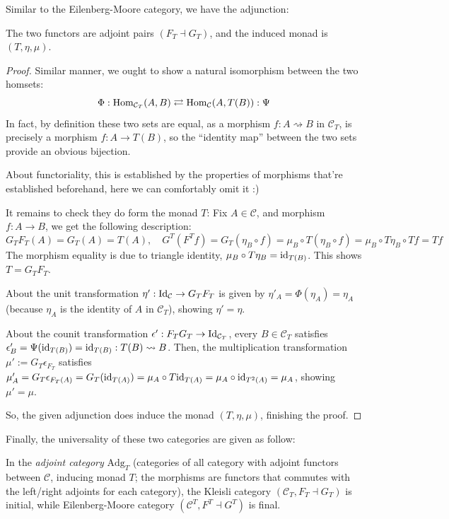 \documentclass{article}
\begin{document}
Similar to the Eilenberg-Moore category, we have the adjunction:
\begin{thm}
The two functors are adjoint pairs $(F_T\dashv G_T)$, and the induced monad is $(T,\eta,\mu)$.
\end{thm}
\begin{proof}
    Similar manner, we ought to show a natural isomorphism between the two homsets:
    \[\Phi:\mathrm{Hom}_{\mathcal{C}_T}(A,B)\rightleftarrows \mathrm{Hom}_\mathcal{C}(A,T(B)):\Psi\]
    In fact, by definition these two sets are equal, as a morphism $f:A\rightsquigarrow B$ in $\mathcal{C}_T$, is precisely a morphism $f:A\rightarrow T(B)$, so the ``identity map'' between the two sets provide an obvious bijection.

    About functoriality, this is established by the properties of morphisms that're established beforehand, here we can comfortably omit it :)

    \hfil

    It remains to check they do form the monad $T$: Fix $A\in\mathcal{C}$, and morphism $f:A\rightarrow B$, we get the following description:
    \[G_T F_T (A) = G_T (A) = T(A),\quad G^T(F^T f) = G_T (\eta_B\circ f) = \mu_B \circ T(\eta_B\circ f) = \mu_B\circ T\eta_B\circ Tf = Tf\]
    The morphism equality is due to triangle identity, $\mu_B\circ T\eta_B = \mathrm{id}_{T(B)}$. This shows $T = G_T F_T$.

    About the unit transformation $\eta':\mathrm{Id}_\mathcal{C}\rightarrow G_T F_T$ is given by $\eta'_A = \Phi(\eta_A) =\eta_A$ (because $\eta_A$ is the identity of $A$ in $\mathcal{C}_T$), showing $\eta'=\eta$.

    About the counit transformation $\epsilon':F_T G_T\rightarrow \mathrm{Id}_{\mathcal{C}_T}$, every $B\in\mathcal{C}_T$ satisfies $\epsilon'_B = \Psi(\mathrm{id}_{T(B)}) = \mathrm{id}_{T(B)}:T(B)\rightsquigarrow B$. Then, the multiplication transformation $\mu':=G_T \epsilon_{F_T}$ satisfies $\mu'_A = G_T \epsilon_{F_T (A)} = G_T(\mathrm{id}_{T(A)}) = \mu_A\circ T\mathrm{id}_{T(A)} = \mu_A\circ \mathrm{id}_{T^2(A)} = \mu_A$, showing $\mu' = \mu$.

    So, the given adjunction does induce the monad $(T,\eta,\mu)$, finishing the proof.
\end{proof}


\hfil

Finally, the universality of these two categories are given as follow:
\begin{thm}
    In the \emph{adjoint category} $\text{Adg}_T$ (categories of all category with adjoint functors between $\mathcal{C}$, inducing monad $T$; the morphisms are functors that commutes with the left/right adjoints for each category), the Kleisli category $(\mathcal{C}_T, F_T\dashv G_T)$ is initial, while Eilenberg-Moore category $(\mathcal{C}^T,F^T\dashv G^T)$ is final.
\end{thm}
\end{document}
